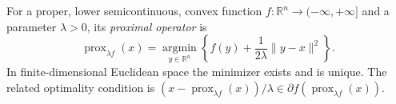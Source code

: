 
For a proper, lower semicontinuous, convex function $f:\mathbb R^n\to(-\infty,+\infty]$ and a parameter $\lambda>0$, its \emph{proximal operator} is
\[
\operatorname{prox}_{\lambda f}(x)=\underset{y\in\mathbb R^n}{\operatorname{argmin}}\left\{f(y)+\frac{1}{2\lambda}\|y-x\|^2\right\}.
\]
In finite-dimensional Euclidean space the minimizer exists and is unique. The related optimality condition is $(x-\operatorname{prox}_{\lambda f}(x))/\lambda\in\partial f(\operatorname{prox}_{\lambda f}(x))$.
